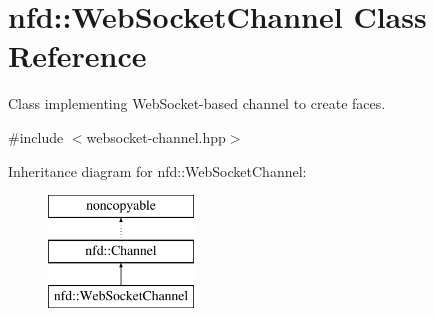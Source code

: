\hypertarget{classnfd_1_1WebSocketChannel}{}\section{nfd\+:\+:Web\+Socket\+Channel Class Reference}
\label{classnfd_1_1WebSocketChannel}


Class implementing Web\+Socket-\/based channel to create faces.  




{\ttfamily \#include $<$websocket-\/channel.\+hpp$>$}

Inheritance diagram for nfd\+:\+:Web\+Socket\+Channel\+:\begin{figure}[H]
\begin{center}
\leavevmode
\includegraphics[height=3.000000cm]{classnfd_1_1WebSocketChannel}
\end{center}
\end{figure}

